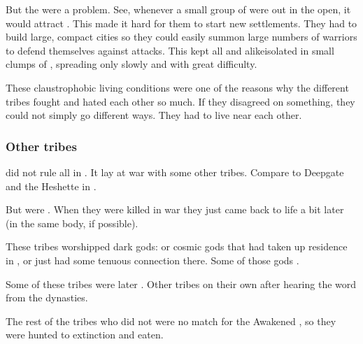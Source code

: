 But the \umbrae{} were a problem. 
See, whenever a small group of \resphain{} were out in the open, it would attract \umbrae.
This made it hard for them to start new settlements. 
They had to build large, compact cities so they could easily summon large numbers of \resphan{} warriors to defend themselves against \umbra{} attacks. 
This kept all \resphain\dash \Merkyrans{} and  alike\dash isolated in small clumps of \Nyx, spreading only slowly and with great difficulty. 

These claustrophobic living conditions were one of the reasons why the different \resphan{} tribes fought and hated each other so much. 
If they disagreed on something, they could not simply go different ways. 
They had to live near each other. 





\subsubsection{Other \resphan{} tribes}
\Merkyrah{} did not rule all \resphain{} in \Nyx. 
It lay at war with some other tribes. 
Compare to Deepgate and the Heshette in . 

But \resphain{} were . 
When they were killed in war they just came back to life a bit later (in the same body, if possible). 

These tribes worshipped dark gods: 
\XzaiShanns{} or cosmic gods that had taken up residence in \Nyx{}, or just had some tenuous connection there. 
Some of those gods . 

Some of these tribes were later . 
Other tribes  on their own after hearing the word from the dynasties. 

The rest of the tribes who did not  were no match for the Awakened \resphain{}, so they were hunted to extinction and eaten. 















